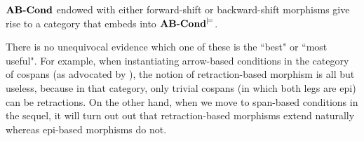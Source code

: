 \begin{proposition}
$\textbf{AB-Cond}$ endowed with either forward-shift or backward-shift morphisms give rise to a category that embeds into $\textbf{AB-Cond}^{\models}$.
\end{proposition}

There is no unequivocal evidence which one of these is the ``best" or ``most useful". For example, when instantiating arrow-based conditions in the category of cospans (as advocated by \cite{Koenig et al}), the notion of retraction-based morphism is all but useless, because in that category, only trivial cospans (in which both legs are epi) can be retractions. On the other hand, when we move to span-based conditions in the sequel, it will turn out out that retraction-based morphisms extend naturally whereas epi-based morphisms do not.

